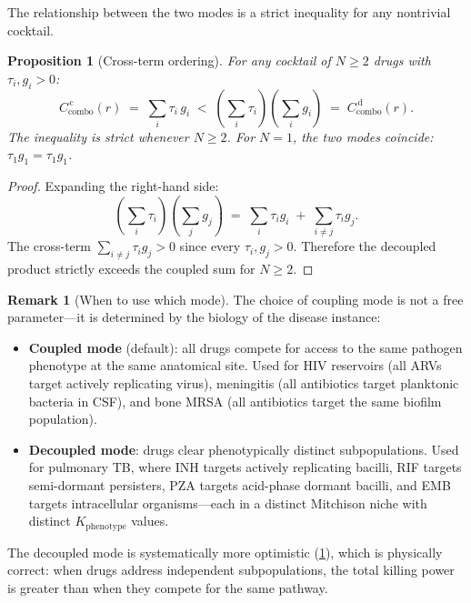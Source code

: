 \documentclass[11pt]{article}
\theoremstyle{plain}
\newtheorem{proposition}[theorem]{Proposition}
\theoremstyle{definition}
\newtheorem{remark}[theorem]{Remark}
\newcommand{\Kpheno}{K_{\mathrm{phenotype}}}
\newcommand{\Ccombo}{C_{\mathrm{combo}}}
\begin{document}
The relationship between the two modes is a strict inequality for
any nontrivial cocktail.

\begin{proposition}[Cross-term ordering]
\label{prop:cross-term}
For any cocktail of $N \geq 2$ drugs with $\tau_i, g_i > 0$:
\begin{equation}
  \label{eq:cross-ordering}
  \Ccombo^{\,\mathrm{c}}(r)
  \;=\; \sum_{i} \tau_i\, g_i
  \;<\;
  \left(\sum_{i} \tau_i\right)\!\left(\sum_{i} g_i\right)
  \;=\; \Ccombo^{\,\mathrm{d}}(r).
\end{equation}
The inequality is strict whenever $N \geq 2$. For $N = 1$, the two
modes coincide: $\tau_1 g_1 = \tau_1 g_1$.
\end{proposition}

\begin{proof}
Expanding the right-hand side:
\[
  \left(\sum_{i} \tau_i\right)\!\left(\sum_{j} g_j\right)
  \;=\; \sum_{i} \tau_i g_i \;+\;
  \sum_{i \neq j} \tau_i g_j.
\]
The cross-term $\sum_{i \neq j} \tau_i g_j > 0$ since every
$\tau_i, g_j > 0$. Therefore the decoupled product strictly exceeds
the coupled sum for $N \geq 2$.
\end{proof}

\begin{remark}[When to use which mode]
\label{rem:coupling-mode}
The choice of coupling mode is not a free parameter---it is
determined by the biology of the disease instance:
\begin{itemize}
  \item \textbf{Coupled mode} (default): all drugs compete for access
    to the same pathogen phenotype at the same anatomical site.
    Used for HIV reservoirs (all ARVs target actively replicating
    virus), meningitis (all antibiotics target planktonic bacteria
    in CSF), and bone MRSA (all antibiotics target the same
    biofilm population).
  \item \textbf{Decoupled mode}: drugs clear phenotypically distinct
    subpopulations. Used for pulmonary TB, where INH targets actively
    replicating bacilli, RIF targets semi-dormant persisters, PZA
    targets acid-phase dormant bacilli, and EMB targets intracellular
    organisms---each in a distinct Mitchison niche with distinct
    $\Kpheno$ values.
\end{itemize}
The decoupled mode is systematically more optimistic
(\cref{prop:cross-term}), which is physically
correct: when drugs address independent subpopulations, the total
killing power is greater than when they compete for the same
pathway.
\end{remark}
\end{document}
